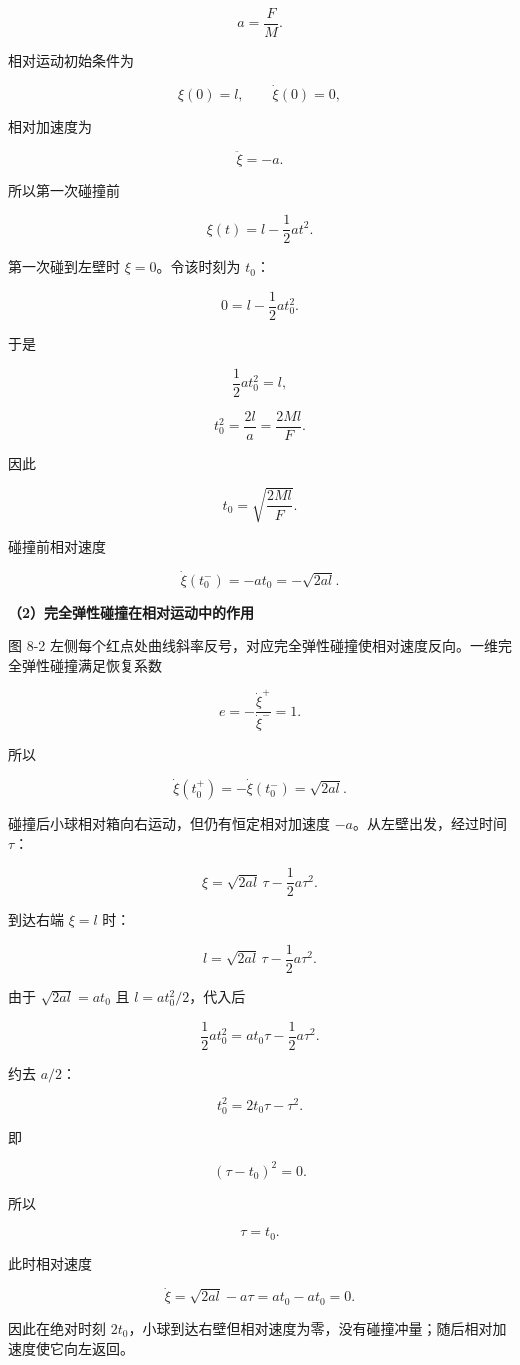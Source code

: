 \documentclass[12pt,a4paper,UTF8]{ctexart}
\begin{document}
\[a=\frac FM.\]

相对运动初始条件为

\[\xi(0)=l,\qquad\dot\xi(0)=0,\]

相对加速度为

\[\ddot\xi=-a.\]

所以第一次碰撞前

\[
\xi(t)=l-\frac12at^2.
\]

第一次碰到左壁时 \(\xi=0\)。令该时刻为 \(t_0\)：

\[
0=l-\frac12at_0^2.
\]

于是

\[
\frac12at_0^2=l,
\]

\[
t_0^2=\frac{2l}{a}=\frac{2Ml}{F}.
\]

因此

\[
\boxed{t_0=\sqrt{\frac{2Ml}{F}}}.
\]

碰撞前相对速度

\[
\dot\xi(t_0^-)= -at_0=-\sqrt{2al}.
\]

\textbf{（2）完全弹性碰撞在相对运动中的作用}

图 8-2
左侧每个红点处曲线斜率反号，对应完全弹性碰撞使相对速度反向。一维完全弹性碰撞满足恢复系数

\[e=-\frac{\dot\xi^+}{\dot\xi^-}=1.\]

所以

\[
\dot\xi(t_0^+)=-\dot\xi(t_0^-)=\sqrt{2al}.
\]

碰撞后小球相对箱向右运动，但仍有恒定相对加速度
\(-a\)。从左壁出发，经过时间 \(\tau\)：

\[
\xi=\sqrt{2al}\,\tau-\frac12a\tau^2.
\]

到达右端 \(\xi=l\) 时：

\[
l=\sqrt{2al}\,\tau-\frac12a\tau^2.
\]

由于 \(\sqrt{2al}=at_0\) 且 \(l=at_0^2/2\)，代入后

\[
\frac12at_0^2=at_0\tau-\frac12a\tau^2.
\]

约去 \(a/2\)：

\[
t_0^2=2t_0\tau-\tau^2.
\]

即

\[
(\tau-t_0)^2=0.
\]

所以

\[\tau=t_0.\]

此时相对速度

\[
\dot\xi=\sqrt{2al}-a\tau=at_0-at_0=0.
\]

因此在绝对时刻
\(2t_0\)，小球到达右壁但相对速度为零，没有碰撞冲量；随后相对加速度使它向左返回。
\end{document}
